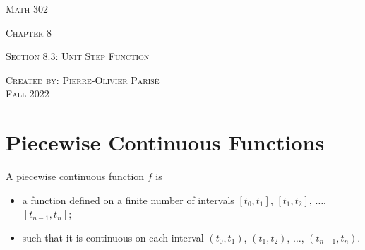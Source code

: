 \documentclass[12pt,a4paper]{article}
\begin{document}
\thispagestyle{empty}

\begin{center}
\vspace*{2.5cm}

{\Huge \textsc{Math 302}}

\vspace*{2cm}

{\LARGE \textsc{Chapter 8}} 

\vspace*{0.75cm}

\noindent\textsc{Section 8.3: Unit Step Function}

\vspace*{0.75cm}

\tableofcontents

\vfill

\noindent \textsc{Created by: Pierre-Olivier Paris{\'e}} \\
\textsc{Fall 2022}
\end{center}

\newpage

\section{Piecewise Continuous Functions}
A piecewise continuous function $f$ is
	\begin{itemize}
	\item a function defined on a finite number of intervals $[t_0, t_1]$, $[t_1, t_2]$, $\ldots$, $[t_{n-1} , t_n]$;
	\item such that it is continuous on each interval $(t_0, t_1)$, $(t_1 , t_2)$, $\ldots$, $(t_{n-1}, t_n)$.
	\end{itemize}
	
	\vspace*{16pt}
	
\end{document}
